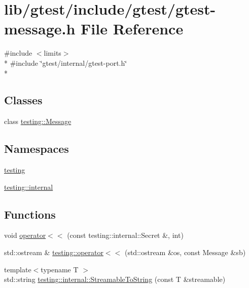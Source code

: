 \hypertarget{gtest-message_8h}{\section{lib/gtest/include/gtest/gtest-\/message.h File Reference}
\label{gtest-message_8h}
}
{\ttfamily \#include $<$limits$>$}\\*
{\ttfamily \#include \char`\"{}gtest/internal/gtest-\/port.\-h\char`\"{}}\\*
\subsection*{Classes}
\begin{DoxyCompactItemize}
\item 
class \hyperlink{classtesting_1_1_message}{testing\-::\-Message}
\end{DoxyCompactItemize}
\subsection*{Namespaces}
\begin{DoxyCompactItemize}
\item 
\hyperlink{namespacetesting}{testing}
\item 
\hyperlink{namespacetesting_1_1internal}{testing\-::internal}
\end{DoxyCompactItemize}
\subsection*{Functions}
\begin{DoxyCompactItemize}
\item 
void \hyperlink{gtest-message_8h_ae8f0c86e5c506587b62315e24a918563}{operator$<$$<$} (const testing\-::internal\-::\-Secret \&, int)
\item 
std\-::ostream \& \hyperlink{namespacetesting_a2d038049296f23fb404311f974788cd3}{testing\-::operator$<$$<$} (std\-::ostream \&os, const Message \&sb)
\item 
{\footnotesize template$<$typename T $>$ }\\std\-::string \hyperlink{namespacetesting_1_1internal_aad4beed95d0846e6ffc5da0978ef3bb9}{testing\-::internal\-::\-Streamable\-To\-String} (const T \&streamable)
\end{DoxyCompactItemize}


